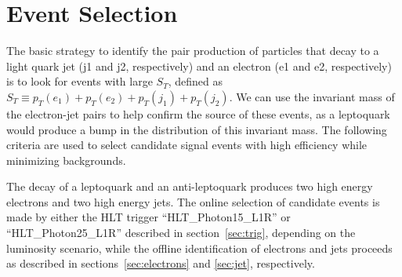 %

\section{Event Selection} \label{sec:eventSelection}


The basic strategy to identify the pair production of particles 
that decay to a light quark jet (j1 and j2, respectively) and an electron 
(e1 and e2, respectively) is to look for events with large $S_T$, defined as
$S_T\equiv p_T(e_1)+p_T(e_2)+p_T(j_1)+p_T(j_2)$.
We can use the invariant mass of the electron-jet pairs to help
confirm the source of these events, as a leptoquark would produce 
a bump in the distribution of this invariant mass.
The following criteria are used to select candidate signal events
with high efficiency while minimizing backgrounds.

%
The decay of a leptoquark and an anti-leptoquark produces two high energy electrons and 
two high energy jets.
The online selection of candidate events is made by either the HLT trigger ``HLT\_Photon15\_L1R'' 
or ``HLT\_Photon25\_L1R'' described in section~\ref{sec:trig}, depending on the luminosity scenario, 
while the offline identification of electrons and jets 
proceeds as described in sections~\ref{sec:electrons} and \ref{sec:jet}, respectively.

